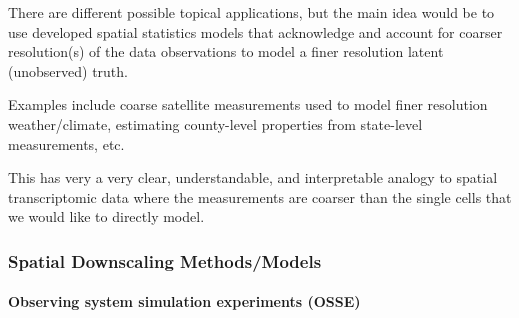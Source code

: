 \documentclass[11pt]{article}
\begin{document}
There are different possible topical applications, but the main
idea would be to use developed spatial statistics models that
acknowledge and account for coarser resolution(s) of the data
observations to model a finer resolution latent (unobserved)
truth.

Examples include coarse satellite measurements used to
model finer resolution weather/climate, estimating county-level
properties from state-level measurements, etc.

This has very a very clear, understandable, and interpretable
analogy to spatial transcriptomic data where the measurements are
coarser than the single cells that we would like to directly
model.

\subsubsection*{Spatial Downscaling Methods/Models}
\label{sec:org135beaf}
\paragraph*{Observing system simulation experiments (OSSE)}
\label{sec:org19ea205}

\end{document}
